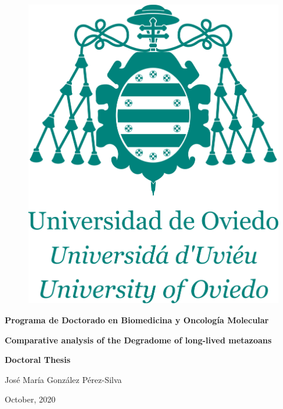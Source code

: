 
\begin{figure}[t]
    \begin{center}
        \includegraphics[width=0.4\columnwidth]{figures/logo_verde_centrado.pdf}
        \caption*{}
    \end{center}
\end{figure}

\begin{center}

\large
\textbf{Programa de Doctorado en Biomedicina y Oncolog\'{i}a Molecular}

\vspace*{1.5cm}

\fontsize{35}{45}
\textbf{Comparative analysis of the Degradome of long-lived metazoans}

\vspace*{3cm}

\huge
\textbf{Doctoral Thesis}

\vspace*{\fill}

\large
Jos\'{e} Mar\'{i}a Gonz\'{a}lez P\'{e}rez-Silva

October, 2020
\end{center}

\restoregeometry
